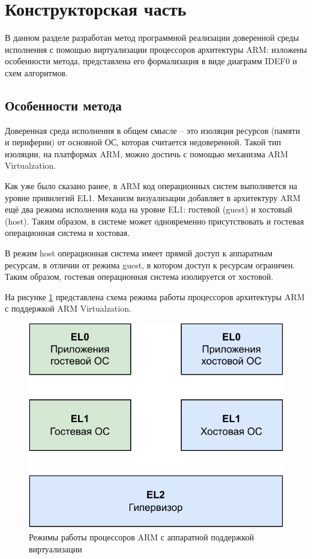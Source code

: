\section{Конструкторская часть}

В данном разделе разработан метод программной реализации доверенной среды исполнения с помощью виртуализации процессоров архитектуры ARM: изложены особенности метода, представлена его формализация в виде диаграмм IDEF0 и схем алгоритмов.

\subsection{Особенности метода}

Доверенная среда исполнения в общем смысле -- это изоляция ресурсов (памяти и периферии) от основной ОС, которая считается недоверенной. Такой тип изоляции, на платформах ARM, можно достичь с помощью механизма ARM Virtualzation. 

Как уже было сказано ранее, в ARM код операционных систем выполняется на уровне привилегий EL1. Механизм визуализации добавляет в архитектуру ARM ещё два режима исполнения кода на уровне EL1: гостевой (guest) и хостовый (host). Таким образом, в системе может одновременно присутствовать и гостевая операционная система и хостовая.

В режим host операционная система имеет прямой доступ к аппаратным ресурсам, в отличии от режима guest, в котором доступ к ресурсам ограничен. Таким образом, гостевая операционная система изолируется от хостовой.

На рисунке \ref{fig:arm-virtualization} представлена схема режима работы процессоров архитектуры ARM с поддержкой ARM Virtualzation.

\begin{figure}[h]
	\centering
	\includegraphics[width=\textwidth]{img/arm-virtualzation.pdf}
	\caption{Режимы работы процессоров ARM с аппаратной поддержкой виртуализации}
	\label{fig:arm-virtualization}
\end{figure}

